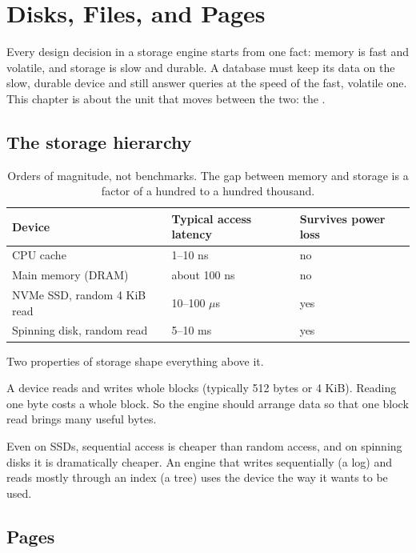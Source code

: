 \chapter{Disks, Files, and Pages}
\label{ch:pages}

Every design decision in a storage engine starts from one fact: memory is fast
and volatile, and storage is slow and durable. A database must keep its data on
the slow, durable device and still answer queries at the speed of the fast,
volatile one. This chapter is about the unit that moves between the two: the
.

\section{The storage hierarchy}

\begin{table}[ht]
\centering
\begin{tabular}{@{}lll@{}}
\toprule
Device & Typical access latency & Survives power loss \\
\midrule
CPU cache & 1--10 ns & no \\
Main memory (DRAM) & about 100 ns & no \\
NVMe SSD, random 4 KiB read & 10--100 $\mu$s & yes \\
Spinning disk, random read & 5--10 ms & yes \\
\bottomrule
\end{tabular}
\caption{Orders of magnitude, not benchmarks. The gap between memory and storage is a factor of a hundred to a hundred thousand.}
\label{tab:hierarchy}
\end{table}

Two properties of storage shape everything above it.

\begin{description}[leftmargin=1.2em]
\item[Block granularity.] A device reads and writes whole blocks (typically 512 bytes or 4 KiB). Reading one byte costs a whole block. So the engine should arrange data so that one block read brings many useful bytes.
\item[Sequential beats random.] Even on SSDs, sequential access is cheaper than random access, and on spinning disks it is dramatically cheaper. An engine that writes sequentially (a log) and reads mostly through an index (a tree) uses the device the way it wants to be used.
\end{description}

\section{Pages}


